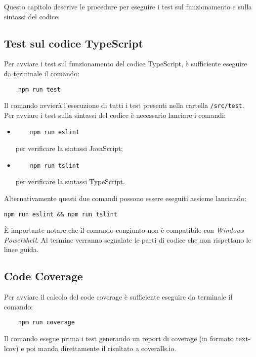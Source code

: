 Questo capitolo descrive le procedure per eseguire i test sul funzionamento e sulla sintassi del codice.
\subsection{Test sul codice TypeScript}
Per avviare i test sul funzionamento del codice TypeScript, è sufficiente eseguire da terminale il comando:
\begin{verbatim}
	npm run test
\end{verbatim}
Il comando avvierà l'esecuzione di tutti i test presenti nella cartella \texttt{/src/test}.
Per avviare i test sulla sintassi del codice è necessario lanciare i comandi:
\begin{itemize}
	\item \begin{verbatim}
	npm run eslint
	\end{verbatim} per verificare la sintassi JavaScript;
	\item \begin{verbatim}
	npm run tslint
	\end{verbatim}
	per verificare la sintassi TypeScript.
\end{itemize}
Alternativamente questi due comandi possono essere eseguiti assieme lanciando:
\begin{verbatim}
npm run eslint && npm run tslint
\end{verbatim}
È importante notare che il comando congiunto non è compatibile con \emph{Windows Powershell}.
Al termine verranno segnalate le parti di codice che non rispettano le linee guida.

\subsection{Code Coverage}
Per avviare il calcolo del code coverage è sufficiente eseguire da terminale il comando:
\begin{verbatim}
	npm run coverage
\end{verbatim}
Il comando esegue prima i test generando un report di coverage (in formato text-lcov) e poi manda direttamente il risultato a coveralls.io.